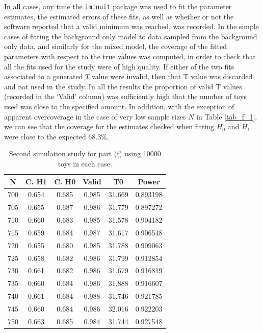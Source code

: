 \documentclass[12pt]{article}
\begin{document}
In all cases, any time the \texttt{iminuit} package was used to fit the parameter estimates, the estimated errors of these fits, as well as whether or not the software reported that a valid minimum was reached, was recorded.
In the simple cases of fitting the background only model to data sampled from the background only data, and similarly for the mixed model, the coverage of the fitted parameters with respect to the true values was computed, in order to check that all the fits used for the study were of high quality.
If either of the two fits associated to a generated $T$ value were invalid, then that T value was discarded and not used in the study. In all the results the proportion of valid T values (recorded in the `Valid' column) was sufficiently high that the number of toys used was close to the specified amount.
In addition, with the exception of apparent overcoverage in the case of very low sample sizes $N$ in Table \ref{tab_f_1}, we can see that the coverage for the estimates checked when fitting $H_0$ and $H_1$ were close to the expected 68.3\%.

\begin{table}
    \centering
    \begin{tabular}{| c | c | c | c | c | c |}
        \hline
          N & C. H1   & C. H0    & Valid   & T0       & Power    \\
        \hline
        700 & 0.654   & 0.685    & 0.985   & 31.669   & 0.893198 \\
        \hline
        705 & 0.655   & 0.687    & 0.986   & 31.779   & 0.897272 \\
        \hline
        710 & 0.660   & 0.683    & 0.985   & 31.578   & 0.904182 \\
        \hline
        715 & 0.659   & 0.684    & 0.987   & 31.617   & 0.906548 \\
        \hline
        720 & 0.655   & 0.680    & 0.985   & 31.788   & 0.909063 \\
        \hline
        725 & 0.658   & 0.682    & 0.986   & 31.799   & 0.912854 \\
        \hline
        730 & 0.661   & 0.682    & 0.986   & 31.679   & 0.916819 \\
        \hline
        735 & 0.660   & 0.684    & 0.986   & 31.888   & 0.916607 \\
        \hline
        740 & 0.661   & 0.684    & 0.988   & 31.746   & 0.921785 \\
        \hline
        745 & 0.660   & 0.684    & 0.986   & 32.016   & 0.922203 \\
        \hline
        750 & 0.663   & 0.685    & 0.984   & 31.744   & 0.927548 \\
        \hline
    \end{tabular}
\caption{Second simulation study for part (f) using 10000 toys in each case.}
\label{tab_f_2}
\end{table}
\end{document}
